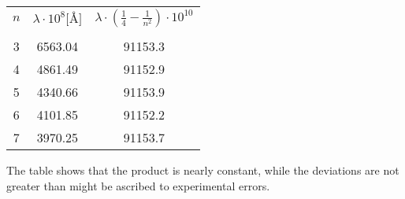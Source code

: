 \begin{center}
\begin{tabular}{c c c}
$n$ & $\lambda \cdot 10^8 \text{[Å]}$ & $\lambda \cdot \left(\frac{1}{4} - \frac{1}{n^2}\right)\cdot 10^{10}$\\
 & & \\
3 & 6563.04 & 91153.3\\

4 & 4861.49 & 91152.9\\

5 & 4340.66 & 91153.9\\

6 & 4101.85 & 91152.2\\

7 & 3970.25 & 91153.7\\
\end{tabular}
\end{center}

The table shows that the product is nearly constant, while the
deviations are not greater than might be ascribed to experimental
errors.

